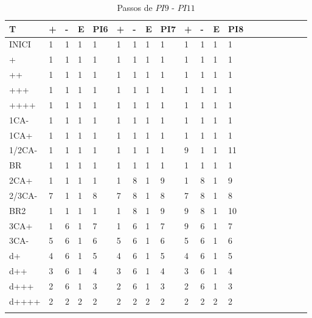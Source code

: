 \documentclass[12pt,a4paper]{report}
\begin{document}
\begin{table}[ht]
\caption{\label{tab:table-name} Passos de $PI9$ - $PI11$}
\centering
\begin{tabular}{ l l l l l l l l l l l l l l l l l l l l }
\hline
\hline
T      & + & - & E & PI6 & + & - & E & PI7 & + & - & E & PI8 &  &  &  &  &  &  &  \\ \hline
INICI  & 1 & 1 & 1 & 1   & 1 & 1 & 1 & 1   & 1 & 1 & 1 & 1   &  &  &  &  &  &  &  \\
+      & 1 & 1 & 1 & 1   & 1 & 1 & 1 & 1   & 1 & 1 & 1 & 1   &  &  &  &  &  &  &  \\
++     & 1 & 1 & 1 & 1   & 1 & 1 & 1 & 1   & 1 & 1 & 1 & 1   &  &  &  &  &  &  &  \\
+++    & 1 & 1 & 1 & 1   & 1 & 1 & 1 & 1   & 1 & 1 & 1 & 1   &  &  &  &  &  &  &  \\
++++   & 1 & 1 & 1 & 1   & 1 & 1 & 1 & 1   & 1 & 1 & 1 & 1   &  &  &  &  &  &  &  \\
1CA-   & 1 & 1 & 1 & 1   & 1 & 1 & 1 & 1   & 1 & 1 & 1 & 1   &  &  &  &  &  &  &  \\
1CA+   & 1 & 1 & 1 & 1   & 1 & 1 & 1 & 1   & 1 & 1 & 1 & 1   &  &  &  &  &  &  &  \\
1/2CA- & 1 & 1 & 1 & 1   & 1 & 1 & 1 & 1   & 9 & 1 & 1 & 11  &  &  &  &  &  &  &  \\
BR     & 1 & 1 & 1 & 1   & 1 & 1 & 1 & 1   & 1 & 1 & 1 & 1   &  &  &  &  &  &  &  \\
2CA+   & 1 & 1 & 1 & 1   & 1 & 8 & 1 & 9   & 1 & 8 & 1 & 9   &  &  &  &  &  &  &  \\
2/3CA- & 7 & 1 & 1 & 8   & 7 & 8 & 1 & 8   & 7 & 8 & 1 & 8   &  &  &  &  &  &  &  \\
BR2    & 1 & 1 & 1 & 1   & 1 & 8 & 1 & 9   & 9 & 8 & 1 & 10  &  &  &  &  &  &  &  \\
3CA+   & 1 & 6 & 1 & 7   & 1 & 6 & 1 & 7   & 9 & 6 & 1 & 7   &  &  &  &  &  &  &  \\
3CA-   & 5 & 6 & 1 & 6   & 5 & 6 & 1 & 6   & 5 & 6 & 1 & 6   &  &  &  &  &  &  &  \\
d+     & 4 & 6 & 1 & 5   & 4 & 6 & 1 & 5   & 4 & 6 & 1 & 5   &  &  &  &  &  &  &  \\
d++    & 3 & 6 & 1 & 4   & 3 & 6 & 1 & 4   & 3 & 6 & 1 & 4   &  &  &  &  &  &  &  \\
d+++   & 2 & 6 & 1 & 3   & 2 & 6 & 1 & 3   & 2 & 6 & 1 & 3   &  &  &  &  &  &  &  \\
d++++  & 2 & 2 & 2 & 2   & 2 & 2 & 2 & 2   & 2 & 2 & 2 & 2   &  &  &  &  &  &  &  \\
       &   &   &   &     &   &   &   &     &   &   &   &     &  &  &  &  &  &  &  \\
       \hline
\end{tabular}
\end{table}
\end{document}
